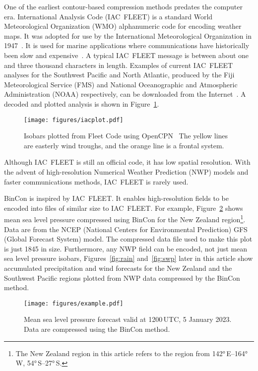 \documentclass[12pt,a4paper]{article}
\begin{document}
One of the earliest contour-based compression methods predates the
computer era. International Analysis Code (IAC~FLEET) is a standard
World Meteorological Organization (WMO) alphanumeric code for encoding
weather maps. It was adopted for use by the International Meteorological
Organization in 1947~\citep[Resolution 156, p.~161]{imo1947}. It is used for
marine applications where communications have historically been slow and
expensive~\citep[pp.~87--90]{wmo2019a}. A typical IAC~FLEET message is
between about one and three thousand characters in length. Examples of current
IAC~FLEET analyses for the Southwest Pacific and North Atlantic,
produced by the Fiji Meteorological Service (FMS) and National
Oceanographic and Atmospheric Administration (NOAA) respectively, can
be downloaded from the Internet~\citep{fms2023, noaa2023}. A decoded and
plotted analysis is shown in Figure~\ref{fig:iacplot}.

\begin{figure}
\centering
\texttt{[image: figures/iacplot.pdf]}
\caption{\label{fig:iacplot}Isobars plotted from Fleet Code using
OpenCPN~\citep{opencpn2023} The yellow lines are easterly wind troughs, and the
orange line is a frontal system.}
\end{figure}

Although IAC~FLEET is still an official code, it has low spatial resolution.
With the advent of high-resolution Numerical Weather Prediction (NWP) models
and faster communications methods, IAC~FLEET is rarely used.

BinCon is inspired by IAC~FLEET. It enables high-resolution fields to be
encoded into files of similar size to IAC~FLEET. For example,
Figure~\ref{fig:BinCon} shows mean sea level pressure compressed using BinCon
for the New Zealand region\footnote{The New Zealand region in this article
refers to the region from \ang{142}\,E--\ang{164}\,W,
\ang{54}\,S--\ang{27}\,S.}. Data are from the NCEP (National Centers for
Environmental Prediction) GFS (Global Forecast System) model. The compressed
data file used to make this plot is just \SI{1845}{\byte} in size. Furthermore,
any NWP field can be encoded, not just mean sea level pressure isobars,
Figures~\ref{fig:rain} and~\ref{fig:swp} later in this article show accumulated
precipitation and wind forecasts for the New Zealand and the Southwest Pacific
regions plotted from NWP data compressed by the BinCon method.

\begin{figure}
\centering
\texttt{[image: figures/example.pdf]}
\caption{\label{fig:BinCon}Mean sea level pressure forecast valid at
1200\,UTC, 5 January 2023. Data are compressed using the BinCon
method.}
\end{figure}
\end{document}
